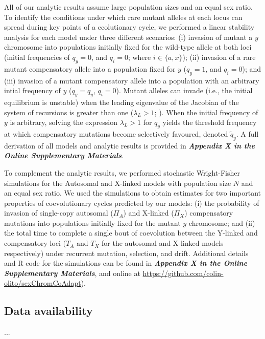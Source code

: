 \documentclass{article}
\begin{document}
All of our analytic results assume large population sizes and an equal sex ratio. To identify the conditions under which rare mutant alleles at each locus can spread during key points of a ecolutionary cycle, we performed a linear stability analysis for each model under three different scenarios: (i) invasion of mutant a $y$ chromosome into populations initially fixed for the wild-type allele at both loci (initial frequencies of $q_y = 0$, and $q_i = 0$; where $i \in \{a,x\}$); (ii) invasion of a rare mutant compensatory allele into a population fixed for $y$ ($q_y = 1$, and $q_i = 0$); and (iii) invasion of a mutant compensatory allele into a population with an arbitrary intial frequency of $y$ ($q_y = q_y$, $q_i = 0$). Mutant alleles can invade (i.e., the initial equilibrium is unstable) when the leading eigenvalue of the Jacobian of the system of recursions is greater than one ($\lambda_L > 1$; \citealt{OttoDay2007}). When the initial frequency of $y$ is arbitrary, solving the expression $\lambda_L > 1$ for $q_y$ yields the threshold frequency at which compensatory mutations become selectively favoured, denoted $\tilde{q}_{y}$. A full derivation of all models and analytic results is provided in {\bf \itshape Appendix X in the Online Supplementary Materials}.

To complement the analytic results, we performed stochastic Wright-Fisher simulations for the Autosomal and X-linked models with population size $N$ and an equal sex ratio. We used the simulations to obtain estimates for two important properties of coevolutionary cycles predicted by our models: (i) the probability of invasion of single-copy autosomal ($\Pi_A$) and X-linked ($\Pi_X$) compensatory mutations into populations initially fixed for the mutant $y$ chromosome; and (ii) the total time to complete a single bout of coevolution between the Y-linked and compensatory loci ($T_{A}$ and $T_{X}$ for the autosomal and X-linked models respectively) under recurrent mutation, selection, and drift. Additional details and R code for the simulations can be found in {\bf \itshape Appendix X in the Online Supplementary Materials}, and online at \url{https://github.com/colin-olito/sexChromCoAdapt}).






\subsection*{Data availability}
...
\end{document}
